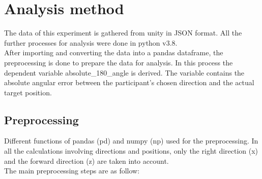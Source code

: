

\section{Analysis method}

The data of this experiment is gathered from unity in JSON format. All the further processes for analysis were done in python \autocite{10.5555/1593511} v3.8. \\
After importing and converting the data into a pandas \autocite{reback2022pandas, mckinney-proc-scipy-2010} dataframe, the preprocessing is done to prepare the data for analysis. In this process the dependent variable {\emphasize absolute\_180\_angle} is derived. The variable contains the absolute angular error between the participant's chosen direction and the actual target position. 

\subsection{Preprocessing}

Different functions of pandas {\emphasize (pd)} and numpy {\emphasize (np)} \autocite{harris2020array} used for the preprocessing. In all the calculations involving directions and positions, only the right direction (x) and the forward direction (z) are taken into account. \\
The main preprocessing steps are as follow:


